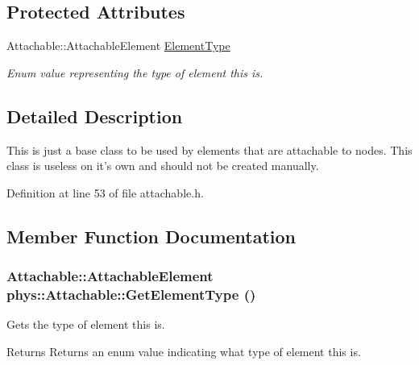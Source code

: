 \subsection*{Protected Attributes}
\begin{DoxyCompactItemize}
\item 
\hypertarget{classphys_1_1Attachable_af574d5f08a304c6e0ae002bb2fc057c7}{
Attachable::AttachableElement \hyperlink{classphys_1_1Attachable_af574d5f08a304c6e0ae002bb2fc057c7}{ElementType}}
\label{df/dbd/classphys_1_1Attachable_af574d5f08a304c6e0ae002bb2fc057c7}

\begin{DoxyCompactList}\small\item\em Enum value representing the type of element this is. \item\end{DoxyCompactList}\end{DoxyCompactItemize}


\subsection{Detailed Description}
This is just a base class to be used by elements that are attachable to nodes. This class is useless on it's own and should not be created manually. 

Definition at line 53 of file attachable.h.



\subsection{Member Function Documentation}
\hypertarget{classphys_1_1Attachable_a5f747000367afd85dfaff3a37976e74c}{
\subsubsection[{GetElementType}]{\setlength{\rightskip}{0pt plus 5cm}Attachable::AttachableElement phys::Attachable::GetElementType ()}}
\label{df/dbd/classphys_1_1Attachable_a5f747000367afd85dfaff3a37976e74c}


Gets the type of element this is. 

\begin{DoxyReturn}{Returns}
Returns an enum value indicating what type of element this is. 
\end{DoxyReturn}


